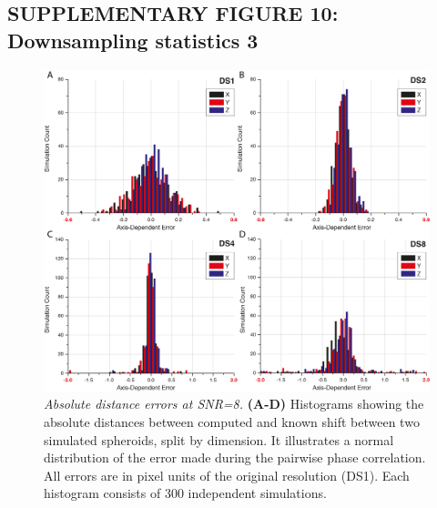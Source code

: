 \documentclass[]{spie}  %
\begin{document}
\pagebreak

\subsection*{SUPPLEMENTARY FIGURE 10: Downsampling statistics 3}
\vspace{1mm}
\begin{figure}[h!]
\includegraphics[width=\textwidth]{fig-downsampling-statistics-2.png}
\vspace{-2.0mm}
\caption{\hspace{-0.5mm} \emph{Absolute distance errors at SNR=8.} \textbf{(A-D)}  Histograms showing the absolute distances between computed and known shift between two simulated spheroids, split by dimension. It illustrates a normal distribution of the error made during the pairwise phase correlation. All errors are in pixel units of the original resolution (DS1). Each histogram consists of 300 independent simulations.
}
\label{fig:sup-fig-downsampling-statistics-2}
\end{figure}

\pagebreak
\end{document}
